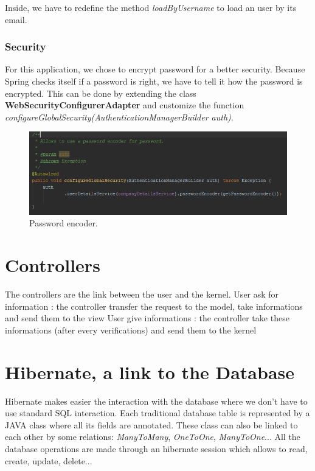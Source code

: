 Inside, we have to redefine the method \textit{loadByUsername} to load an user by its email. 

\subsubsection{Security}
For this application, we chose to encrypt password for a better security. Because Spring checks itself if a password is right, we have to tell it how the password is encrypted. This can be done by extending the class \textbf{WebSecurityConfigurerAdapter} and customize the function \textit{configureGlobalSecurity(AuthenticationManagerBuilder auth)}.


\begin{figure}[H]
  \caption{Password encoder.}
  \centering
    \includegraphics[width=1\textwidth]{img/passwordencoder.png}
\end{figure}




\section{Controllers}

The controllers are the link between the user and the kernel.
User ask for information : the controller transfer the request to the model, take informations and send them to the view
User give informations : the controller take these informations (after every verifications) and send them to the kernel


\section{Hibernate, a link to the Database}

Hibernate makes easier the interaction with the database where we don't have to use standard SQL interaction. 
Each traditional database table is represented by a JAVA class where all its fields are annotated. These class can also be linked to each other by some relations: \textit{ManyToMany}, \textit{OneToOne}, \textit{ManyToOne}...
All the database operations are made through an hibernate session which allows to read, create, update, delete...

